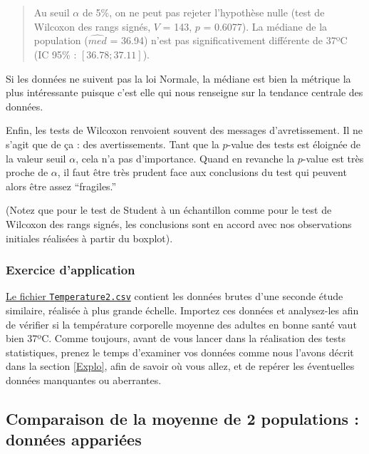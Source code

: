 \documentclass[
  a4paper,
]{article}
\begin{document}
\begin{quote}
Au seuil \(\alpha\) de 5\%, on ne peut pas rejeter l'hypothèse nulle (test de Wilcoxon des rangs signés, \(V\) = 143, \(p\) = 0.6077). La médiane de la population (\(\widehat{med}\) = 36.94) n'est pas significativement différente de 37ºC (IC 95\% : \([36.78 ; 37.11]\)).
\end{quote}

Si les données ne suivent pas la loi Normale, la médiane est bien la métrique la plus intéressante puisque c'est elle qui nous renseigne sur la tendance centrale des données.

Enfin, les tests de Wilcoxon renvoient souvent des messages d'avretissement. Il ne s'agit que de ça : des avertissements. Tant que la \(p\)-value des tests est éloignée de la valeur seuil \(\alpha\), cela n'a pas d'importance. Quand en revanche la \(p\)-value est très proche de \(\alpha\), il faut être très prudent face aux conclusions du test qui peuvent alors être assez ``fragiles.''

(Notez que pour le test de Student à un échantillon comme pour le test de Wilcoxon des rangs signés, les conclusions sont en accord avec nos observations initiales réalisées à partir du boxplot).

\hypertarget{exercice-dapplication}{%
\subsubsection{Exercice d'application}\label{exercice-dapplication}}

\href{https://besibo.github.io/Biometrie3/data/Temperature2.csv}{Le fichier \texttt{Temperature2.csv}} contient les données brutes d'une seconde étude similaire, réalisée à plus grande échelle. Importez ces données et analysez-les afin de vérifier si la température corporelle moyenne des adultes en bonne santé vaut bien 37ºC. Comme toujours, avant de vous lancer dans la réalisation des tests statistiques, prenez le temps d'examiner vos données comme nous l'avons décrit dans la section \ref{Explo}, afin de savoir où vous allez, et de repérer les éventuelles données manquantes ou aberrantes.

\hypertarget{comparaison-de-la-moyenne-de-2-populations-donnuxe9es-appariuxe9es}{%
\subsection{Comparaison de la moyenne de 2 populations : données appariées}\label{comparaison-de-la-moyenne-de-2-populations-donnuxe9es-appariuxe9es}}
\end{document}
